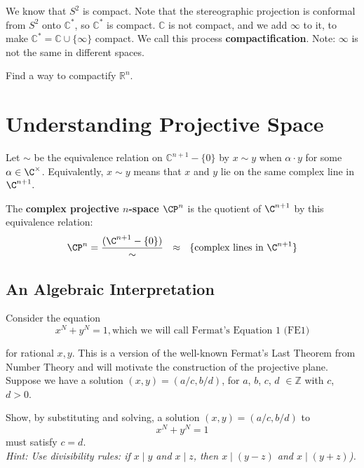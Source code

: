 \documentclass[11pt]{article}
\begin{document}
We know that $S^2$ is compact. Note that the stereographic projection is conformal from $S^2$ onto $\mathbb{C}^*$, so $\mathbb{C}^*$ is compact. $\mathbb{C}$ is not compact, and we add $\infty$ to it, to make $\mathbb{C}^*=\mathbb{C}\cup \{\infty\}$ compact. We call this process \textbf{compactification}. Note: $\infty$ is not the same in different spaces.  \\

\begin{exercise*} Find a way to compactify $\mathbb{R}^n$. \end{exercise*}

\section{Understanding Projective Space}

Let $\sim$ be the equivalence relation on $\mathbb{C}^{n+1} - \{ 0 \}$ by $x \sim y$ when $\alpha \cdot y$ for some $\alpha \in \C^{\times}$. Equivalently, $x \sim y$ means that $x$ and $y$ lie on the same complex line in $\C^{n+1}.$ \\

\begin{definition}
    The \textbf{complex projective $n$-space $\CP^{n}$} is the quotient of $\C^{n+1}$ by this equivalence relation:
\[ \CP^n = \frac{(\C^{n+1} - \{0\})}{\sim} \, \, \, \, \approx \, \, \, \, \{ \text{complex lines in } \C^{n+1} \} \]
\end{definition} 
\subsection{An Algebraic Interpretation}

Consider the equation \[ x^N + y^N = 1, \text{which we will call Fermat's Equation 1 (FE1)} \]

for rational $x, y$. This is a version of the well-known Fermat's Last Theorem from Number Theory and will motivate the construction of the projective plane. \\

Suppose we have a solution $(x, y) = (a/c, b/d)$, for $a$, $b$, $c$, $d$ $\in \mathbb{Z}$ with $c$, $d > 0$. \\

\begin{exercise*} Show, by substituting and solving, a solution $(x, y) = (a/c, b/d)$ to \[x^N + y^N = 1\] must satisfy $c = d$. \\

\textit{Hint: Use divisibility rules: if $x \mid y$ and $x \mid z$, then $x \mid (y-z)$ and $x \mid (y+z)$).}
\end{exercise*}
\end{document}
